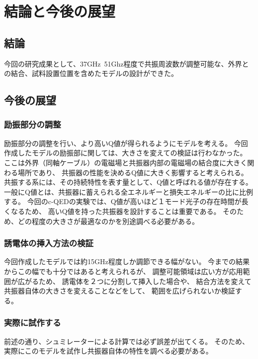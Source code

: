 \chapter{結論と今後の展望}
\section{結論}
今回の研究成果として、37GHz~51Ghz程度で共振周波数が調整可能な、外界との結合、試料設置位置を含めたモデルの設計ができた。

\section{今後の展望}

\subsection*{励振部分の調整}
励振部分の調整を行い、より高いQ値が得られるようにモデルを考える。
今回作成したモデルの励振部に関しては、大きさを変えての検証は行わなかった。
ここは外界（同軸ケーブル）の電磁場と共振器内部の電磁場の結合度に大きく関わる場所であり、
共振器の性能を決めるQ値に大きく影響すると考えられる。
共振する系には、その持続特性を表す量として、Q値と呼ばれる値が存在する。
一般にQ値とは、共振器に蓄えられる全エネルギーと損失エネルギーの比に比例する。
今回のc-QEDの実験では、Q値が高いほど１モード光子の存在時間が長くなるため、
高いQ値を持った共振器を設計することは重要である。
そのため、どの程度の大きさが最適なのかを別途調べる必要がある。

\subsection*{誘電体の挿入方法の検証}
今回作成したモデルでは約15GHz程度しか調節できる幅がない。
今までの結果からこの幅でも十分ではあると考えられるが、
調整可能領域は広い方が応用範囲が広がるため、
誘電体を２つに分割して挿入した場合や、
結合方法を変えて共振器自体の大きさを変えることなどをして、
範囲を広げられないか検証する。

\subsection*{実際に試作する}
前述の通り、シュミレーターによる計算では必ず誤差が出てくる。
そのため、実際にこのモデルを試作し共振器自体の特性を調べる必要がある。
